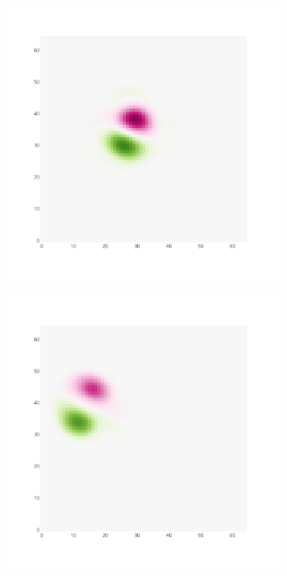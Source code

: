 \begin{figure}[htbp]
	\begin{subfigure}{0.32\textwidth}
		\includegraphics[width=\linewidth]{images/app2d/best_estimate_2.pdf}
	\end{subfigure}
	\hfill
	\begin{subfigure}{0.32\textwidth}
		\includegraphics[width=\linewidth]{images/app2d/best_estimate_10.pdf}

\end{subfigure}
\end{figure}
